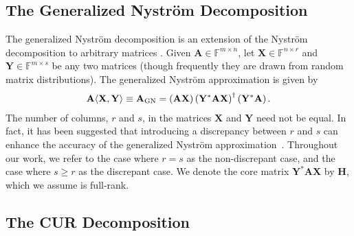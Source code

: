 \documentclass[11pt]{article}
\newcommand{\npnote}[1]{\textit{\textcolor{cyan}{NP: #1}}}
\newcommand{\llnote}[1]{\textit{\textcolor{olive}{LL: #1}}}
\newcommand{\GN}{generalized Nyström}
\newcommand{\Ny}{Nyström}
\newcommand{\GNa}{generalized Nyström approximation}
\newcommand{\nX}{A_{\textup{N}}}
\newcommand{\F}{\mathbb{F}}
\begin{document}
\subsection{The Generalized Nystr\"om Decomposition}
\label{sec:N-GN-approx}
The \GN{} decomposition is an extension of the \Ny{} decomposition \cite{Gittens2016} to arbitrary matrices \cite{nakatsukasaFastStableRandomized2020}.
Given $\mathbf{A} \in \F^{m \times n}$, let $\mathbf{X} \in \F^{n \times r}$ and $\mathbf{Y} \in \F^{m \times s}$ be any two matrices (though frequently they are drawn from random matrix distributions).
The \GNa{} is given by
\begin{align}
    \label{eq:genNys}
    \mathbf{A} \langle \mathbf{X}, \mathbf{Y} \rangle \equiv \mathbf{A}_{\textup{GN}} = \left (\mathbf{A} \mathbf{X} \right ) \left ( \mathbf{Y}^* \mathbf{A} \mathbf{X} \right )^\dag \left ( \mathbf{Y}^* \mathbf{A} \right ).
\end{align}
The number of columns, $r$ and $s$, in the matrices $\mathbf{X}$ and $\mathbf{Y}$ need not be equal.
In fact, it has been suggested that introducing a discrepancy between $r$ and $s$ can enhance the accuracy of the \GNa~\cite{nakatsukasaFastStableRandomized2020}.
Throughout our work, we refer to the case where $r = s$ as the non-discrepant case, and the case where $s\geq r$ as the discrepant case.
We denote the core matrix $\mathbf{Y}^* \mathbf{A} \mathbf{X}$ by $\mathbf{H}$, which we assume is full-rank.


\subsection{The CUR Decomposition}
\label{sec:CUR}
\end{document}
